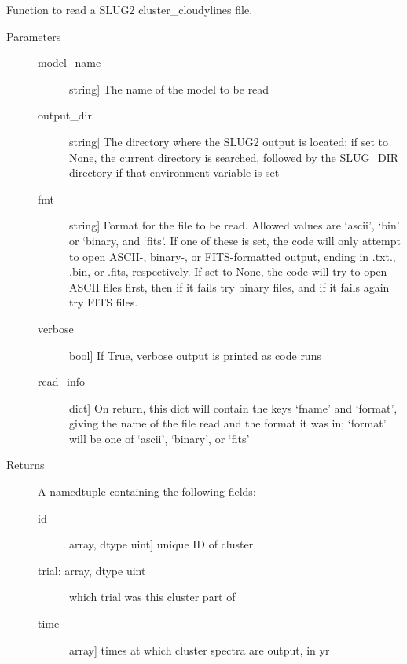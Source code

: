 \documentclass[letterpaper,10pt,english]{sphinxmanual}
\begin{document}
\begin{fulllineitems}
\label{cloudy:slugpy.cloudy.read_cluster_cloudylines}
Function to read a SLUG2 cluster\_cloudylines file.
\begin{description}
\item[{Parameters}] \leavevmode\begin{description}
\item[{model\_name}] \leavevmode{[}string{]}
The name of the model to be read

\item[{output\_dir}] \leavevmode{[}string{]}
The directory where the SLUG2 output is located; if set to None,
the current directory is searched, followed by the SLUG\_DIR
directory if that environment variable is set

\item[{fmt}] \leavevmode{[}string{]}
Format for the file to be read. Allowed values are `ascii',
`bin' or `binary, and `fits'. If one of these is set, the code
will only attempt to open ASCII-, binary-, or FITS-formatted
output, ending in .txt., .bin, or .fits, respectively. If set
to None, the code will try to open ASCII files first, then if
it fails try binary files, and if it fails again try FITS
files.

\item[{verbose}] \leavevmode{[}bool{]}
If True, verbose output is printed as code runs

\item[{read\_info}] \leavevmode{[}dict{]}
On return, this dict will contain the keys `fname' and
`format', giving the name of the file read and the format it
was in; `format' will be one of `ascii', `binary', or `fits'

\end{description}

\item[{Returns}] \leavevmode
A namedtuple containing the following fields:
\begin{description}
\item[{id}] \leavevmode{[}array, dtype uint{]}
unique ID of cluster

\item[{trial: array, dtype uint}] \leavevmode
which trial was this cluster part of

\item[{time}] \leavevmode{[}array{]}
times at which cluster spectra are output, in yr


\end{description}
\end{description}
\end{fulllineitems}
\end{document}
